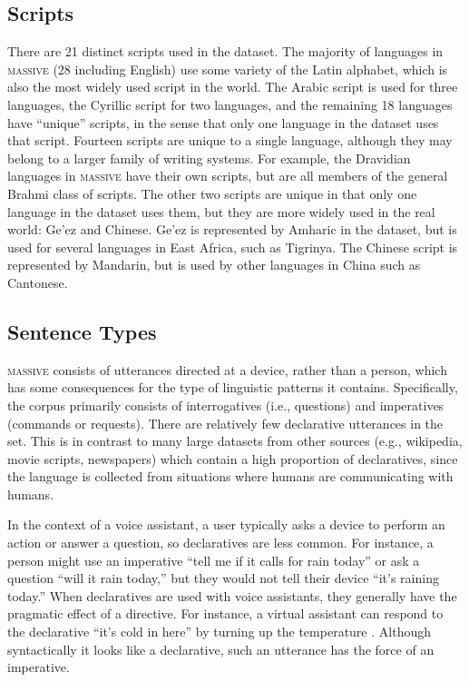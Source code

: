 \documentclass[11pt]{article}
\newcommand{\M}{\textsc{massive}}
\begin{document}
\subsection{Scripts} \label{sect:Scripts}

There are 21 distinct scripts used in the dataset.
The majority of languages in \M{} (28 including English) use some variety of the Latin alphabet, which is also the most widely used script in the world.
The Arabic script is used for three languages, the Cyrillic script for two languages, and the remaining 18 languages have ``unique'' scripts, in the sense that only one language in the dataset uses that script.
Fourteen scripts are unique to a single language, although they may belong to a larger family of writing systems.
For example, the Dravidian languages in \M{} have their own scripts, but are all members of the general Brahmi class of scripts.
The other two scripts are unique in that only one language in the dataset uses them, but they are more widely used in the real world: Ge'ez and Chinese.
Ge'ez is represented by Amharic in the dataset, but is used for several languages in East Africa, such as Tigrinya.
The Chinese script is represented by Mandarin, but is used by other languages in China such as Cantonese.

\subsection{Sentence Types} \label{sect:SentenceTypes}

\M{} consists of utterances directed at a device, rather than a person, which has some consequences for the type of linguistic patterns it contains.
Specifically, the corpus primarily consists of interrogatives (i.e., questions) and imperatives (commands or requests).
There are relatively few declarative utterances in the set.
This is in contrast to many large datasets from other sources (e.g., wikipedia, movie scripts, newspapers) which contain a high proportion of declaratives, since the language is collected from situations where humans are communicating with humans.

In the context of a voice assistant, a user typically asks a device to perform an action or answer a question, so declaratives are less common.
For instance, a person might use an imperative ``tell me if it calls for rain today'' or ask a question ``will it rain today,'' but they would not tell their device ``it's raining today.''
When declaratives are used with voice assistants, they generally have the pragmatic effect of a directive. For instance, a virtual assistant can respond to the declarative ``it's cold in here'' by turning up the temperature \cite{thattai_tur_natarajan_2020}.
Although syntactically it looks like a declarative, such an utterance has the force of an imperative.
\end{document}
